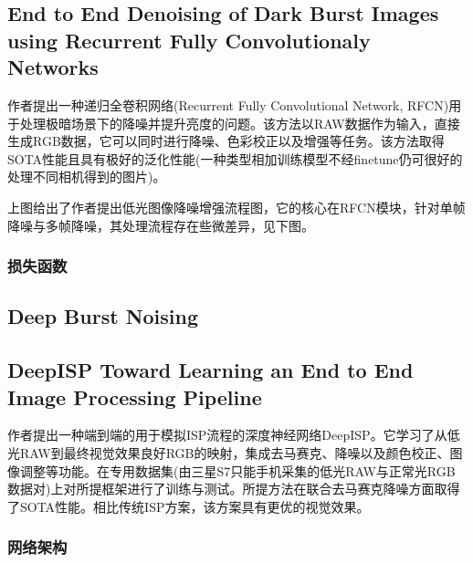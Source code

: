 \documentclass[letterpaper,12pt]{article}
\begin{document}
		
	
	\subsection{End to End Denoising of Dark Burst Images using Recurrent Fully Convolutionaly Networks}
	
	作者提出一种递归全卷积网络(Recurrent Fully Convolutional Network, RFCN)用于处理极暗场景下的降噪并提升亮度的问题。该方法以RAW数据作为输入，直接生成RGB数据，它可以同时进行降噪、色彩校正以及增强等任务。该方法取得SOTA性能且具有极好的泛化性能(一种类型相加训练模型不经finetune仍可很好的处理不同相机得到的图片)。
	
	上图给出了作者提出低光图像降噪增强流程图，它的核心在RFCN模块，针对单帧降噪与多帧降噪，其处理流程存在些微差异，见下图。
	
		\subsubsection{损失函数}
	
	\subsection{Deep Burst Noising}
	\subsection{DeepISP Toward Learning an End to End Image Processing Pipeline}
	
	作者提出一种端到端的用于模拟ISP流程的深度神经网络DeepISP。它学习了从低光RAW到最终视觉效果良好RGB的映射，集成去马赛克、降噪以及颜色校正、图像调整等功能。在专用数据集(由三星S7只能手机采集的低光RAW与正常光RGB数据对)上对所提框架进行了训练与测试。所提方法在联合去马赛克降噪方面取得了SOTA性能。相比传统ISP方案，该方案具有更优的视觉效果。
	
		\subsubsection{网络架构}
		
\end{document}
